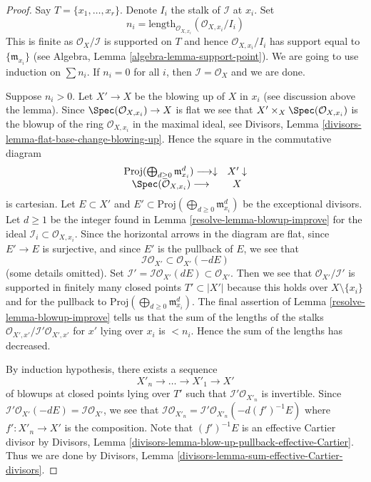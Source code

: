 \begin{proof}

Say $T = \{x_1, \ldots, x_r\}$. Denote $I_i$ the stalk of $\mathcal{I}$ at
$x_i$. Set
$$
n_i = \text{length}_{\mathcal{O}_{X, x_i}}(\mathcal{O}_{X, x_i}/I_i)
$$
This is finite as $\mathcal{O}_X/\mathcal{I}$ is supported on $T$
and hence $\mathcal{O}_{X, x_i}/I_i$ has support equal to
$\{\mathfrak m_{x_i}\}$ (see Algebra, Lemma \ref{algebra-lemma-support-point}).
We are going to use induction on $\sum n_i$. If $n_i = 0$ for all
$i$, then $\mathcal{I} = \mathcal{O}_X$ and we are done.

\medskip\noindent
Suppose $n_i > 0$. Let $X' \to X$ be the blowing up of $X$ in $x_i$
(see discussion above the lemma).
Since $\Spec(\mathcal{O}_{X, x_i}) \to X$ is flat we see that
$X' \times_X \Spec(\mathcal{O}_{X, x_i})$ is the blowup of
the ring $\mathcal{O}_{X, x_i}$ in the maximal ideal, see
Divisors, Lemma
\ref{divisors-lemma-flat-base-change-blowing-up}.
Hence the square in the commutative diagram
$$
\begin{array}{cc}\text{Proj}(\bigoplus\nolimits_{d \geq 0} \mathfrak m_{x_i}^d) \longrightarrow\downarrow & X' \downarrow \\ \Spec(\mathcal{O}_{X, x_i}) \longrightarrow & X\end{array}
$$
is cartesian. Let $E \subset X'$ and
$E' \subset \text{Proj}(\bigoplus\nolimits_{d \geq 0} \mathfrak m_{x_i}^d)$
be the exceptional divisors. Let $d \geq 1$ be the integer found in
Lemma \ref{resolve-lemma-blowup-improve} for the ideal
$\mathcal{I}_i \subset \mathcal{O}_{X, x_i}$.
Since the horizontal arrows in the diagram are flat, since
$E' \to E$ is surjective, and since $E'$ is the pullback of $E$, we see that
$$
\mathcal{I}\mathcal{O}_{X'} \subset \mathcal{O}_{X'}(-dE)
$$
(some details omitted).
Set $\mathcal{I}' = \mathcal{I}\mathcal{O}_{X'}(dE) \subset \mathcal{O}_{X'}$.
Then we see that $\mathcal{O}_{X'}/\mathcal{I}'$ is supported in finitely
many closed points $T' \subset |X'|$ because this holds over
$X \setminus \{x_i\}$ and for the pullback to
$\text{Proj}(\bigoplus\nolimits_{d \geq 0} \mathfrak m_{x_i}^d)$.
The final assertion of Lemma \ref{resolve-lemma-blowup-improve}
tells us that the sum of the lengths of the stalks
$\mathcal{O}_{X', x'}/\mathcal{I}'\mathcal{O}_{X', x'}$
for $x'$ lying over $x_i$ is $< n_i$. Hence the sum of the lengths
has decreased.

\medskip\noindent
By induction hypothesis, there exists a sequence
$$
X'_n \to \ldots \to X'_1 \to X'
$$
of blowups at closed points lying over $T'$ such that
$\mathcal{I}'\mathcal{O}_{X'_n}$ is invertible. Since
$\mathcal{I}'\mathcal{O}_{X'}(-dE) = \mathcal{I}\mathcal{O}_{X'}$, we see
that $\mathcal{I}\mathcal{O}_{X'_n} =
\mathcal{I}'\mathcal{O}_{X'_n}(-d(f')^{-1}E)$
where $f' : X'_n \to X'$ is the composition.
Note that $(f')^{-1}E$ is an effective Cartier divisor by
Divisors, Lemma \ref{divisors-lemma-blow-up-pullback-effective-Cartier}.
Thus we are done by
Divisors, Lemma \ref{divisors-lemma-sum-effective-Cartier-divisors}.
\end{proof}

